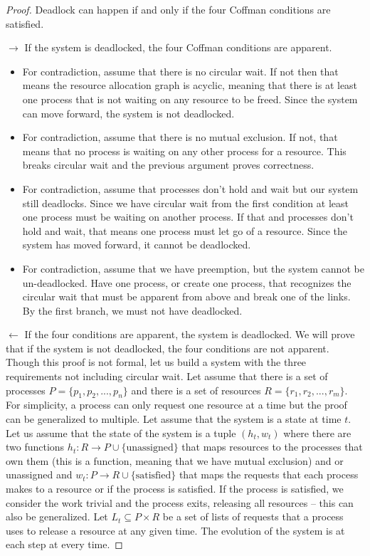 \begin{proof} Deadlock can happen if and only if the four Coffman conditions are satisfied.
	
	$\rightarrow$ If the system is deadlocked, the four Coffman conditions are apparent.
	
	\begin{itemize}
		\item For contradiction, assume that there is no circular wait. If not then that means the resource allocation graph is acyclic, meaning that there is at least one process that is not waiting on any resource to be freed. Since the system can move forward, the system is not deadlocked.
		\item For contradiction, assume that there is no mutual exclusion. If not, that means that no process is waiting on any other process for a resource. This breaks circular wait and the previous argument proves correctness.
		\item For contradiction, assume that processes don't hold and wait but our system still deadlocks. Since we have circular wait from the first condition at least one process must be waiting on another process. If that and processes don't hold and wait, that means one process must let go of a resource. Since the system has moved forward, it cannot be deadlocked.
		\item For contradiction, assume that we have preemption, but the system cannot be un-deadlocked. Have one process, or create one process, that recognizes the circular wait that must be apparent from above and break one of the links. By the first branch, we must not have deadlocked.
	\end{itemize}
	
	$\leftarrow$ If the four conditions are apparent, the system is deadlocked.
	We will prove that if the system is not deadlocked, the four conditions are not apparent.
	Though this proof is not formal, let us build a system with the three requirements not including circular wait.
	Let assume that there is a set of processes $P = \{p_1, p_2, ..., p_n\}$ and there is a set of resources $R = \{r_1, r_2, ..., r_m\}$.
	For simplicity, a process can only request one resource at a time but the proof can be generalized to multiple.
	Let assume that the system is a state at time $t$.
	Let us assume that the state of the system is a tuple $(h_t, w_t)$ where there are two functions $h_t: R \rightarrow P \cup \{\text{unassigned}\}$ that maps resources to the processes that own them (this is a function, meaning that we have mutual exclusion) and or unassigned and $w_t: P \rightarrow R \cup \{\text{satisfied}\}$ that maps the requests that each process makes to a resource or if the process is satisfied.
	If the process is satisfied, we consider the work trivial and the process exits, releasing all resources -- this can also be generalized.
	Let $L_t \subseteq P \times R$ be a set of lists of requests that a process uses to release a resource at any given time.
	The evolution of the system is at each step at every time.
	

\end{proof}
